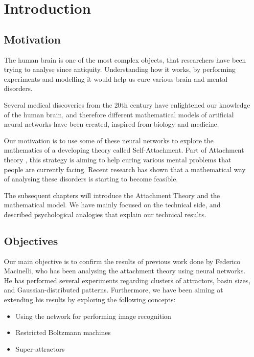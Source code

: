 \chapter{Introduction}

\section{Motivation}

The human brain is one of the most complex objects, that researchers have been trying to analyse since antiquity. Understanding how it works, by performing experiments and modelling it would help us cure various brain and mental disorders.

Several medical discoveries from the 20th century have enlightened our knowledge of the human brain, and therefore different mathematical models of artificial neural networks have been created, inspired from biology and medicine.

Our motivation is to use some of these neural networks to explore the mathematics of a developing theory called Self-Attachment. Part of Attachment theory , this strategy is aiming to help curing various mental problems that people are currently facing. Recent research has shown that a mathematical way of analysing these disorders is starting to become feasible. \cite{net_model_neuroses}

The subsequent chapters will introduce the Attachment Theory and the mathematical model. We have mainly focused on the technical side, and described  psychological analogies that explain our technical results.

\section{Objectives}

Our main objective is to confirm the results of previous work done by Federico Macinelli, who has been analysing the attachment theory using neural networks. He has performed several experiments regarding clusters of attractors, basin sizes, and Gaussian-distributed patterns. Furthermore, we have been aiming at extending his results by exploring the following concepts:
\begin{itemize}
\item Using the network for performing image recognition
\item Restricted Boltzmann machines
\item Super-attractors
\end{itemize}

